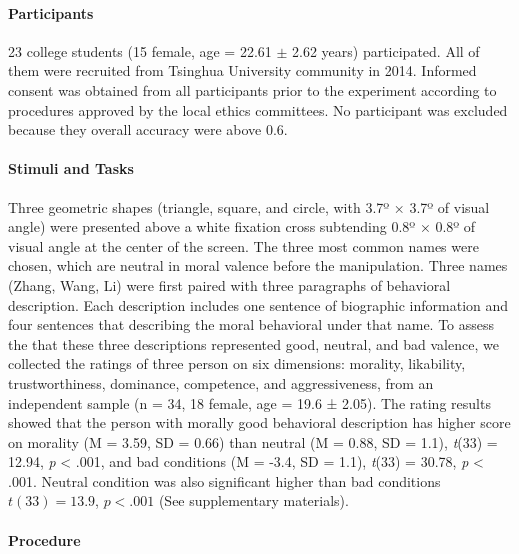 \documentclass[
  english,
  man]{apa6}
\let\oldparagraph\paragraph
\renewcommand{\paragraph}[1]{\oldparagraph{#1}\mbox{}}
\begin{document}
\hypertarget{participants-2}{%
\paragraph{Participants}\label{participants-2}}

23 college students (15 female, age = 22.61 \(\pm\) 2.62 years) participated. All of them were recruited from Tsinghua University community in 2014. Informed consent was obtained from all participants prior to the experiment according to procedures approved by the local ethics committees. No participant was excluded because they overall accuracy were above 0.6.

\hypertarget{stimuli-and-tasks-2}{%
\paragraph{Stimuli and Tasks}\label{stimuli-and-tasks-2}}

Three geometric shapes (triangle, square, and circle, with 3.7º × 3.7º of visual angle) were presented above a white fixation cross subtending 0.8º × 0.8º of visual angle at the center of the screen. The three most common names were chosen, which are neutral in moral valence before the manipulation.
Three names (Zhang, Wang, Li) were first paired with three paragraphs of behavioral description. Each description includes one sentence of biographic information and four sentences that describing the moral behavioral under that name. To assess the that these three descriptions represented good, neutral, and bad valence, we collected the ratings of three person on six dimensions: morality, likability, trustworthiness, dominance, competence, and aggressiveness, from an independent sample (n = 34, 18 female, age = 19.6 ± 2.05). The rating results showed that the person with morally good behavioral description has higher score on morality (M = 3.59, SD = 0.66) than neutral (M = 0.88, SD = 1.1), \emph{t}(33) = 12.94, \emph{p} \textless{} .001, and bad conditions (M = -3.4, SD = 1.1), \emph{t}(33) = 30.78, \emph{p} \textless{} .001. Neutral condition was also significant higher than bad conditions \(t(33) = 13.9\), \(p < .001\) (See supplementary materials).

\hypertarget{procedure-2}{%
\paragraph{Procedure}\label{procedure-2}}
\end{document}
